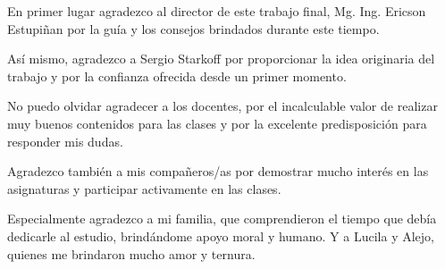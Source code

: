 \documentclass[
11pt, %
spanish,
singlespacing, %
parskip, %
headsepline, %
]{MastersDoctoralThesis} %
\begin{document}
\begin{acknowledgements}
\addchaptertocentry{\acknowledgementname} %
\vspace{1.5cm}

En primer lugar agradezco al director de este trabajo final, Mg. Ing. Ericson Estupiñan por la guía y los consejos brindados durante este tiempo.

Así mismo, agradezco a Sergio Starkoff por proporcionar la idea originaria del trabajo y por la confianza ofrecida desde un primer momento.

No puedo olvidar agradecer a los docentes, por el incalculable valor de realizar muy buenos contenidos para las clases y por la excelente predisposición para responder mis dudas.

Agradezco también a mis compañeros/as por demostrar mucho interés en las asignaturas y participar activamente en las clases.

Especialmente agradezco a mi familia, que comprendieron el tiempo que debía dedicarle al estudio, brindándome apoyo moral y humano. Y a Lucila y Alejo, quienes me brindaron mucho amor y ternura.





\end{acknowledgements}


\tableofcontents %

\listoffigures %

\listoftables %




\end{document}
